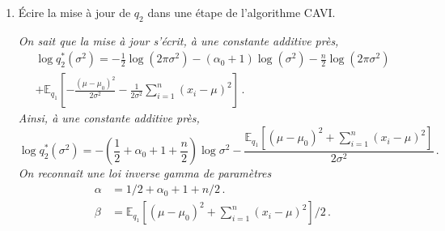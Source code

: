 \documentclass[a4paper,10pt,fleqn]{article}
\newcommand{\1}{\ensuremath{\mathbbm{1}}}
\begin{document}
\begin{enumerate}
\vspace{.2cm}

{\em
On sait que la mise \`a jour s'\'ecrit, \`a une constante additive pr\`es,
$$
\log q^*_1(\mu) = \mathbb{E}_{q_{2}}\left[- \frac{(\mu-\mu_0)^2}{2\sigma^2} - \frac{1}{2\sigma^2}\sum_{i=1}^n(x_i-\mu)^2\right]\,.
$$
Ainsi, \`a une constante additive pr\`es,
$$
\log q^*_1(\mu) = -\mathbb{E}_{q_{2}}\left[\frac{n+1}{2\sigma^2}\left(\mu - \frac{\mu_0 + n\bar x_n}{n+1}\right)^2\right]\,,
$$
o\`u $\bar x_n = \sum_{i=1}^n x_i/n$. Ainsi, %
$$
\log q^*_1(\mu) = -\frac{1}{2}(n+1)\mathbb{E}_{q_{2}}[1/\sigma^2]\left(\mu - \frac{\mu_0 + n\bar x_n}{n+1}\right)^2\,.
$$
On en d\'eduit que $q^*_1$ est la densit\'e de la loi gaussienne de moyenne $(\mu_0 + n\bar x_n)/(n+1)$  et dont l'inverse de la variance est $(n+1)\mathbb{E}_{q_{2}}[1/\sigma^2]$ (qui est calculable lorsque $q_{2}$ est une loi inverse gamma).
}
\item \'Ecire la mise \`a jour de $q_{2}$ dans une \'etape de l'algorithme CAVI. 

\vspace{.2cm}

{\em
On sait que la mise \`a jour s'\'ecrit, \`a une constante additive pr\`es,
\begin{multline*}
\log q^*_{2}(\sigma^2) =  -\frac{1}{2}\log(2\pi \sigma^2) - (\alpha_0+1)\log(\sigma^{2})  -\frac{n}{2}\log(2\pi \sigma^2)\\
+\mathbb{E}_{q_1}\left[- \frac{(\mu-\mu_0)^2}{2\sigma^2}  - \frac{1}{2\sigma^2}\sum_{i=1}^n(x_i-\mu)^2\right]\,.
\end{multline*}
Ainsi, \`a une constante additive pr\`es,
$$
\log q^*_{2}(\sigma^2) = -\left(\frac{1}{2} + \alpha_0+1+\frac{n}{2}\right)\log\sigma^2 -\frac{\mathbb{E}_{q_1}\left[(\mu-\mu_0)^2 + \sum_{i=1}^n(x_i-\mu)^2\right]}{2\sigma^2}\,.
$$
On reconna\^it une loi inverse gamma de param\`etres 
\begin{align*}
\alpha &= 1/2 + \alpha_0+1+n/2\,.\\
\beta &= \mathbb{E}_{q_1}\left[(\mu-\mu_0)^2 + \sum_{i=1}^n(x_i-\mu)^2\right]/2\,.
\end{align*}
}
\end{enumerate}
\end{document}
